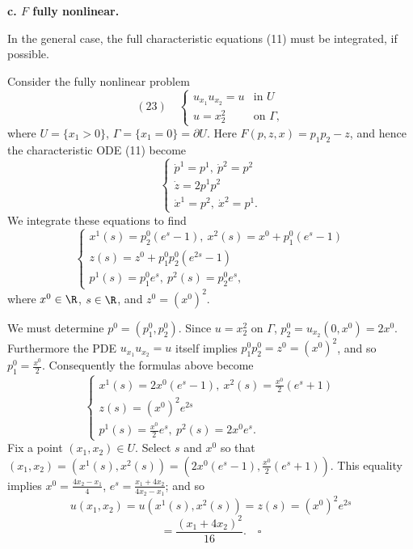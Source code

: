 \textbf{c. $F$ fully nonlinear.}

In the general case, the full characteristic equations (11) must be integrated, if possible.

\begin{example}
\label{ex:fully-nonlinear-halfspace-characteristics}
Consider the fully nonlinear problem
$$(23) \quad \begin{cases} u_{x_1}u_{x_2} = u & \text{in } U \\ u = x_2^2 & \text{on } \Gamma, \end{cases}$$
where $U = \{x_1 > 0\}$, $\Gamma = \{x_1 = 0\} = \partial U$. Here $F(p,z,x) = p_1 p_2 - z$, and hence the characteristic ODE (11) become
$$\begin{cases} \dot{p}^1 = p^1, \ \dot{p}^2 = p^2 \\ \dot{z} = 2p^1 p^2 \\ \dot{x}^1 = p^2, \ \dot{x}^2 = p^1. \end{cases}$$
We integrate these equations to find
$$\begin{cases} x^1(s) = p_2^0(e^s - 1), \ x^2(s) = x^0 + p_1^0(e^s-1) \\ z(s) = z^0 + p_1^0 p_2^0 (e^{2s}-1) \\ p^1(s) = p_1^0 e^s, \ p^2(s) = p_2^0 e^s, \end{cases}$$
where $x^0 \in \R$, $s \in \R$, and $z^0 = (x^0)^2$.

We must determine $p^0 = (p_1^0, p_2^0)$. Since $u = x_2^2$ on $\Gamma$, $p_2^0 = u_{x_2}(0,x^0) = 2x^0$. Furthermore the PDE $u_{x_1}u_{x_2} = u$ itself implies $p_1^0 p_2^0 = z^0 = (x^0)^2$, and so $p_1^0 = \frac{x^0}{2}$. Consequently the formulas above become
$$\begin{cases} x^1(s) = 2x^0(e^s-1), \ x^2(s) = \frac{x^0}{2}(e^s+1) \\ z(s) = (x^0)^2 e^{2s} \\ p^1(s) = \frac{x^0}{2}e^s, \ p^2(s) = 2x^0 e^s. \end{cases}$$
Fix a point $(x_1,x_2) \in U$. Select $s$ and $x^0$ so that $(x_1,x_2) = (x^1(s), x^2(s)) = (2x^0(e^s-1), \frac{x^0}{2}(e^s+1))$. This equality implies $x^0 = \frac{4x_2-x_1}{4}$, $e^s = \frac{x_1+4x_2}{4x_2-x_1}$; and so
$$u(x_1,x_2) = u(x^1(s),x^2(s)) = z(s) = (x^0)^2 e^{2s}$$
$$= \frac{(x_1+4x_2)^2}{16}. \quad \square$$
\end{example}

